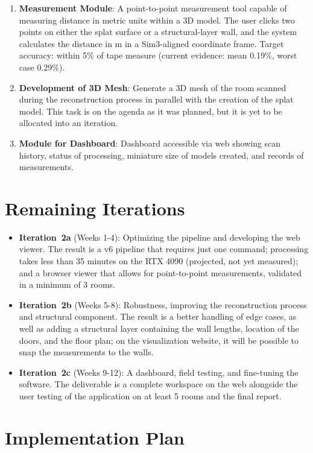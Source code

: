 \begin{enumerate}
    \item \textbf{Measurement Module}: A point-to-point measurement tool capable of measuring distance in metric units within a 3D model. The user clicks two points on either the splat surface or a structural-layer wall, and the system calculates the distance in m in a Sim3-aligned coordinate frame. Target accuracy: within 5\% of tape measure (current evidence: mean 0.19\%, worst case 0.29\%).

    \item \textbf{Development of 3D Mesh}: Generate a 3D mesh of the room scanned during the reconstruction process in parallel with the creation of the splat model. This task is on the agenda as it was planned, but it is yet to be allocated into an iteration.

    \item \textbf{Module for Dashboard}: Dashboard accessible via web showing scan history, status of processing, miniature size of models created, and records of measurements.
\end{enumerate}

\section{Remaining Iterations}

\begin{itemize}
    \item \textbf{Iteration~2a} (Weeks 1-4): Optimizing the pipeline and developing the web viewer. The result is a v6 pipeline that requires just one command; processing takes less than 35 minutes on the RTX 4090 (projected, not yet measured); and a browser viewer that allows for point-to-point measurements, validated in a minimum of 3 rooms.
    \item \textbf{Iteration~2b} (Weeks 5-8): Robustness, improving the reconstruction process and structural component. The result is a better handling of edge cases, as well as adding a structural layer containing the wall lengths, location of the doors, and the floor plan; on the visualization website, it will be possible to snap the measurements to the walls.
    \item \textbf{Iteration~2c} (Weeks 9-12): A dashboard, field testing, and fine-tuning the software. The deliverable is a complete workspace on the web alongside the user testing of the application on at least 5 rooms and the final report.
\end{itemize}

\section{Implementation Plan}

